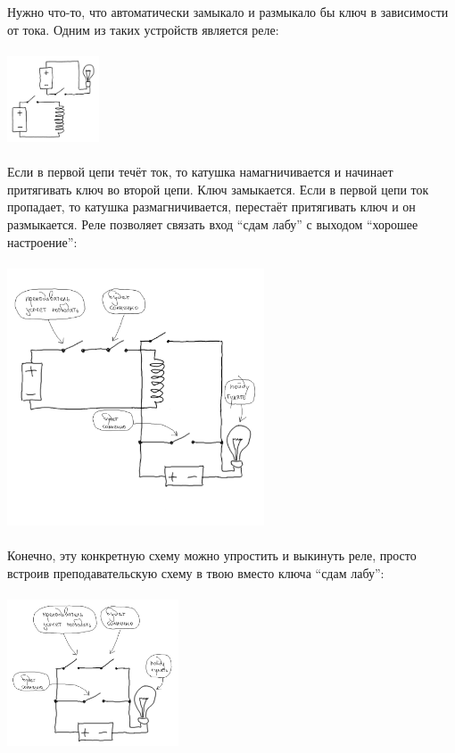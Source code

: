 \documentclass[11pt]{book}
\begin{document}
\\ \\
Нужно что-то, что автоматически замыкало и размыкало бы ключ в зависимости от тока.
Одним из таких устройств является реле:
\\ \\
\includegraphics[height=1in]{pic/11.png}
\\ \\
Если в первой цепи течёт ток, то катушка намагничивается и начинает притягивать
ключ во второй цепи. Ключ замыкается. Если в первой цепи ток пропадает, то катушка размагничивается,
перестаёт притягивать ключ и он размыкается. Реле позволяет связать вход
``сдам лабу'' с выходом ``хорошее настроение'':
\\ \\
\includegraphics[width=3in]{pic/12.png}
\\ \\
Конечно, эту конкретную схему можно упростить и выкинуть реле, просто встроив преподавательскую схему
в твою вместо ключа ``сдам лабу'':
\\ \\
\includegraphics[width=2in]{pic/13.png}
\end{document}
